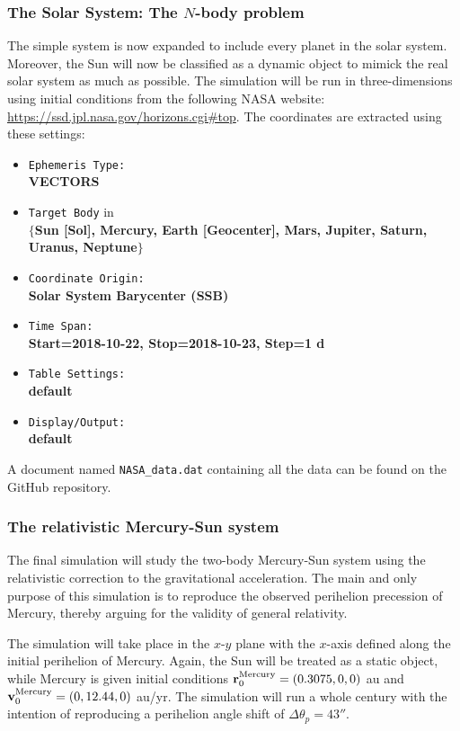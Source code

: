 \documentclass[reprint,english]{revtex4-1}
\begin{document}
\subsubsection{The Solar System: The \(N\)-body problem}
The simple system is now expanded to include every planet in the solar system. Moreover, the Sun will now be classified as a dynamic object to mimick the real solar system as much as possible. The simulation will be run in three-dimensions using initial conditions from the following NASA website: {\small\url{https://ssd.jpl.nasa.gov/horizons.cgi#top}}. \cite{NASA} The coordinates are extracted using these settings:
{\small
\begin{itemize}
\item[]\texttt{Ephemeris Type:}\\
       \textbf{VECTORS}
\item[]\texttt{Target Body} in \\
       \(\{\)\textbf{Sun [Sol], Mercury, Earth [Geocenter], Mars, Jupiter, Saturn, Uranus, Neptune}\(\}\)
\item[]\texttt{Coordinate Origin:}\\
       \textbf{Solar System Barycenter (SSB)}
\item[]\texttt{Time Span:}\\
       \textbf{Start=2018-10-22, Stop=2018-10-23, Step=1 d}
\item[]\texttt{Table Settings:}\\
       \textbf{default}
\item[]\texttt{Display/Output:}\\
       \textbf{default}
\end{itemize}
}

A document named \texttt{NASA\_data.dat} containing all the data can be found on the GitHub repository.
\subsubsection{The relativistic Mercury-Sun system}
The final simulation will study the two-body Mercury-Sun system using the relativistic correction to the gravitational acceleration. The main and only purpose of this simulation is to reproduce the observed perihelion precession of Mercury, thereby arguing for the validity of general relativity.

The simulation will take place in the \(x\)-\(y\) plane with the \(x\)-axis defined along the initial perihelion of Mercury. Again, the Sun will be treated as a static object, while Mercury is given initial conditions \(\vb{r}_0^\text{Mercury}=(0.3075,0,0)\) au and \(\vb{v}_0^\text{Mercury}=(0,12.44,0)\) au/yr. The simulation will run a whole century with the intention of reproducing a perihelion angle shift of \(\Delta\theta_p=43''\).
\end{document}
